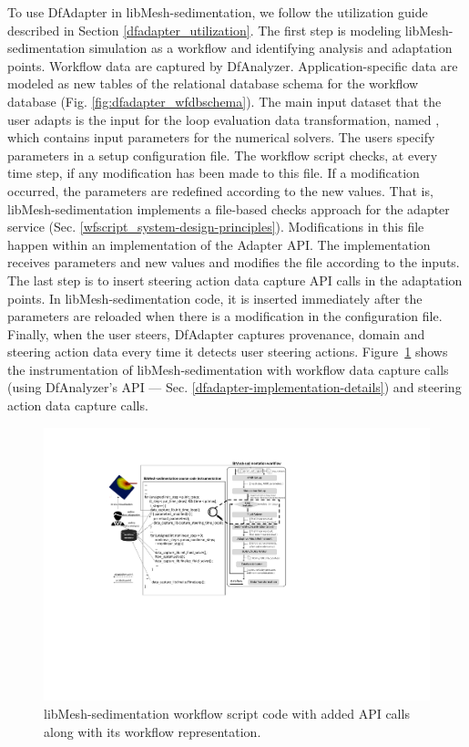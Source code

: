 To use DfAdapter in libMesh-sedimentation, we follow the utilization guide described in Section \ref{dfadapter_utilization}.
The first step is modeling libMesh-sedimentation simulation as a workflow and identifying analysis and adaptation points. Workflow data are captured by DfAnalyzer. Application-specific data are modeled as new tables of the relational database schema for the workflow database (Fig. \ref{fig:dfadapter_wfdbschema}).
The main input dataset that the user adapts is the input for the loop evaluation data transformation, named , which contains input parameters for the numerical solvers. The users specify parameters in a setup configuration file. The workflow script checks, at every time step, if any modification has been made to this file. If a modification occurred, the parameters are redefined according to the new values. That is, libMesh-sedimentation implements a file-based checks approach for the adapter service (Sec. \ref{wfscript_system-design-principles}).
Modifications in this file happen within an implementation of the Adapter API. The implementation receives parameters and new values and modifies the file according to the inputs.
 The last step is to insert steering action data capture API calls in the adaptation points.
 In libMesh-sedimentation code, it is inserted immediately after the parameters are reloaded when there is a modification in the configuration file.
 Finally, when the user steers, DfAdapter captures provenance, domain and steering action data every time it detects user steering actions.
 Figure~\ref{fig:libmesh_sed_cppode} 
 shows the instrumentation
 of libMesh-sedimentation with workflow data capture calls (using DfAnalyzer's API --- Sec. \ref{dfadapter-implementation-details}) and steering action data capture calls.


\begin{figure}[H]
    \centering
    \includegraphics[width=\textwidth,keepaspectratio]{img/libmesh-experiment.pdf}
    \caption{libMesh-sedimentation workflow script code with added API calls along with its  workflow representation.}
    \label{fig:libmesh_sed_cppode}
\end{figure}



